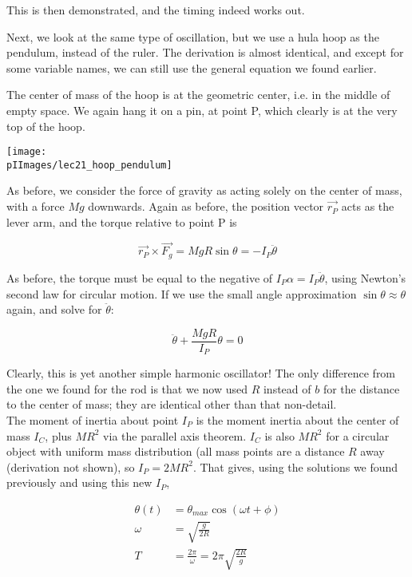 This is then demonstrated, and the timing indeed works out.

Next, we look at the same type of oscillation, but we use a hula hoop as the pendulum, instead of the ruler. The derivation is almost identical, and except for some variable names, we can still use the general equation we found earlier.

The center of mass of the hoop is at the geometric center, i.e. in the middle of empty space. We again hang it on a pin, at point P, which clearly is at the very top of the hoop.

\begin{center}
\texttt{[image: \\pIImages/lec21\_hoop\_pendulum]}
\end{center}

As before, we consider the force of gravity as acting solely on the center of mass, with a force $M g$ downwards. Again as before, the position vector $\vec{r_P}$ acts as the lever arm, and the torque relative to point P is

\begin{equation}
\vec{r_P} \times \vec{F_g} = M g R \sin \theta = -I_P \ddot{\theta}
\end{equation}

As before, the torque must be equal to the negative of $I_P \alpha = I_P \ddot{\theta}$, using Newton's second law for circular motion. If we use the small angle approximation $\sin \theta \approx \theta$ again, and solve for $\ddot{\theta}$:

\begin{equation}
\ddot{\theta} + \frac{M g R}{I_P} \theta = 0
\end{equation}

Clearly, this is yet another simple harmonic oscillator! The only difference from the one we found for the rod is that we now used $R$ instead of $b$ for the distance to the center of mass; they are identical other than that non-detail.\\
The moment of inertia about point $I_P$ is the moment inertia about the center of mass $I_C$, plus $M R^2$ via the parallel axis theorem. $I_C$ is also $M R^2$ for a circular object with uniform mass distribution (all mass points are a distance $R$ away (derivation not shown), so $I_P = 2 M R^2$. That gives, using the solutions we found previously and using this new $I_P$,

\begin{align}
\theta(t) &= \theta_{max} \cos(\omega t + \phi)\\
\omega    &= \sqrt{\frac{g}{2 R}}\\
T         &= \frac{2 \pi}{\omega} = 2 \pi \sqrt{\frac{2 R}{g}}
\end{align}

